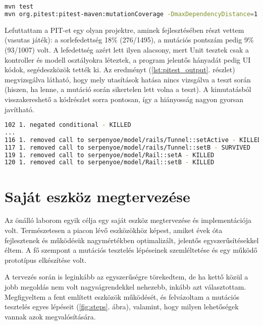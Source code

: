 \begin{lstlisting}[frame=single,float=!ht,caption={Példa a PITest paraméterezésére},captionpos=b,label={lst:pitest_bash},language=bash]
mvn test
mvn org.pitest:pitest-maven:mutationCoverage -DmaxDependencyDistance=1 -DtimeoutConstant=250
\end{lstlisting}

Lefuttattam a PIT-et egy olyan projektre, aminek fejlesztésében részt vettem (vasutas játék): a sorlefedettség 18\% (276/1495), a mutációs pontszám pedig 9\% (93/1007) volt. A lefedettség azért lett ilyen alacsony, mert Unit tesztek csak a kontroller és modell osztályokra léteztek, a program jelentős hányadát pedig UI kódok, segédeszközök tették ki. Az eredményt (\ref{lst:pitest_output}. részlet) megvizsgálva látható, hogy mely utasítások hatása nincs vizsgálva a teszt során (hiszen, ha lenne, a mutáció során sikertelen lett volna a teszt). A kimutatásból visszakereshető a kódrészlet sorra pontosan, így a hiányosság nagyon gyorsan javítható.

\begin{lstlisting}[frame=single,float=!ht,caption={PIT kimenete},captionpos=b,label={lst:pitest_output},language=bash]
102	1. negated conditional - KILLED
...
116	1. removed call to serpenyoe/model/rails/Tunnel::setActive - KILLED
117	1. removed call to serpenyoe/model/rails/Tunnel::setB - SURVIVED
119	1. removed call to serpenyoe/model/Rail::setA - KILLED
120	1. removed call to serpenyoe/model/Rail::setB - KILLED
\end{lstlisting}

\section{Saját eszköz megtervezése}
Az önálló laborom egyik célja egy saját eszköz megtervezése és implementációja volt. Természetesen a piacon lévő eszközökhöz képest, amiket évek óta fejlesztenek és működésük nagymértékben optimalizált, jelentős egyszerűsítésekkel éltem. A fő szempont a mutációs tesztelés lépéseinek szemléltetése és egy működő prototípus elkészítése volt.

A tervezés során is leginkább az egyszerűségre törekedtem, de ha kettő közül a jobb megoldás nem volt nagyságrendekkel nehezebb, inkább azt választottam. Megfigyeltem a fent említett eszközök működését, és felvázoltam a mutációs tesztelés egyes lépéseit (\ref{fig:steps}. ábra), valamint, hogy milyen lehetőségek vannak azok megvalósítására.

